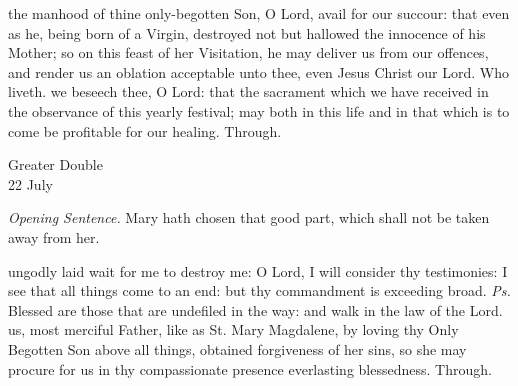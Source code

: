 \secret
{} the manhood of thine only-begotten Son, O Lord, avail for our succour: that even as he, being born of a Virgin, destroyed not but hallowed the innocence of his Mother; so on this feast of her Visitation, he may deliver us from our offences, and render us an oblation acceptable unto thee, even Jesus Christ our Lord. Who liveth.
\postcommunion
{} we beseech thee, O Lord: that the sacrament which we have received in the observance of this yearly festival; may both in this life and in that which is to come be profitable for our healing. Through.

\begin{inhead}
    {Greater Double\\
22 July}
\end{inhead}
\par\noindent
\textit{Opening Sentence.} Mary hath chosen that good part, which shall not be taken away from her.%



\introit
{} ungodly laid wait for me to destroy me: O Lord, I will consider thy testimonies: I see that all things come to an end: but thy commandment is exceeding broad. \textit{Ps.} Blessed are those that are undefiled in the way: and walk in the law of the Lord.
\collect
 us, most merciful Father, like as St. Mary Magdalene, by loving thy Only Begotten Son above all things, obtained forgiveness of her sins, so she may procure for us in thy compassionate presence everlasting blessedness. Through.

